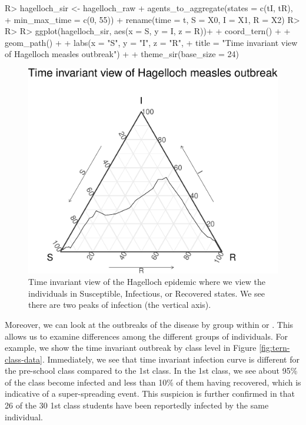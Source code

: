\documentclass[
  shortnames]{jss}
\begin{document}
\begin{CodeChunk}
\begin{CodeInput}
R> hagelloch_sir <- hagelloch_raw %
+   agents_to_aggregate(states = c(tI, tR),
+                       min_max_time = c(0, 55)) %
+   rename(time = t, S = X0, I = X1, R = X2)
R> 
R> 
R> ggplot(hagelloch_sir, aes(x = S, y = I, z = R))+
+   coord_tern() +
+   geom_path() +
+   labs(x = "S", y = "I", z = "R",
+        title = "Time invariant view of Hagelloch measles outbreak") + 
+   theme_sir(base_size = 24)
\end{CodeInput}
\begin{figure}[H]

{\centering \includegraphics{Figs/unnamed-chunk-9-1} 

}

\caption{\label{fig:hag-tern-raw}Time invariant view of the Hagelloch epidemic where we view the individuals in Susceptible, Infectious, or Recovered states.  We see there are two peaks of infection (the vertical axis).}\label{fig:unnamed-chunk-9}
\end{figure}
\end{CodeChunk}

Moreover, we can look at the outbreaks of the disease by group within
 or . This allows us
to examine differences among the different groups of individuals. For
example, we show the time invariant outbreak by class level in Figure
\ref{fig:tern-class-data}. Immediately, we see that time invariant
infection curve is different for the pre-school class compared to the
1st class. In the 1st class, we see about 95\% of the class become
infected and less than 10\% of them having recovered, which is
indicative of a super-spreading event. This suspicion is further
confirmed in that 26 of the 30 1st class students have been reportedly
infected by the same individual.
\end{document}
